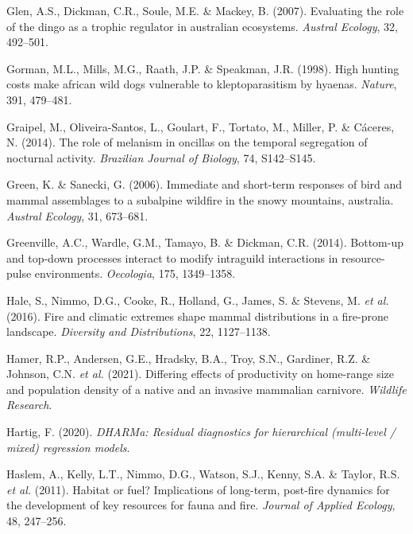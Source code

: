 \documentclass[11pt,a4paper,titlepage,twoside,openright]{style/unimelbthesis}
\begin{document}
\begin{mainmatter}
\leavevmode\hypertarget{ref-glen2007evaluating}{}%
Glen, A.S., Dickman, C.R., Soule, M.E. \& Mackey, B. (2007). Evaluating the role of the dingo as a trophic regulator in australian ecosystems. \emph{Austral Ecology}, 32, 492--501.

\leavevmode\hypertarget{ref-gorman1998high}{}%
Gorman, M.L., Mills, M.G., Raath, J.P. \& Speakman, J.R. (1998). High hunting costs make african wild dogs vulnerable to kleptoparasitism by hyaenas. \emph{Nature}, 391, 479--481.

\leavevmode\hypertarget{ref-graipel2014role}{}%
Graipel, M., Oliveira-Santos, L., Goulart, F., Tortato, M., Miller, P. \& Cáceres, N. (2014). The role of melanism in oncillas on the temporal segregation of nocturnal activity. \emph{Brazilian Journal of Biology}, 74, S142--S145.

\leavevmode\hypertarget{ref-green2006immediate}{}%
Green, K. \& Sanecki, G. (2006). Immediate and short-term responses of bird and mammal assemblages to a subalpine wildfire in the snowy mountains, australia. \emph{Austral Ecology}, 31, 673--681.

\leavevmode\hypertarget{ref-greenville2014bottom}{}%
Greenville, A.C., Wardle, G.M., Tamayo, B. \& Dickman, C.R. (2014). Bottom-up and top-down processes interact to modify intraguild interactions in resource-pulse environments. \emph{Oecologia}, 175, 1349--1358.

\leavevmode\hypertarget{ref-hale2016fire}{}%
Hale, S., Nimmo, D.G., Cooke, R., Holland, G., James, S. \& Stevens, M. \emph{et al.} (2016). Fire and climatic extremes shape mammal distributions in a fire-prone landscape. \emph{Diversity and Distributions}, 22, 1127--1138.

\leavevmode\hypertarget{ref-hamer2021differing}{}%
Hamer, R.P., Andersen, G.E., Hradsky, B.A., Troy, S.N., Gardiner, R.Z. \& Johnson, C.N. \emph{et al.} (2021). Differing effects of productivity on home-range size and population density of a native and an invasive mammalian carnivore. \emph{Wildlife Research}.

\leavevmode\hypertarget{ref-DHARMa}{}%
Hartig, F. (2020). \emph{DHARMa: Residual diagnostics for hierarchical (multi-level / mixed) regression models}.

\leavevmode\hypertarget{ref-haslem2011habitat}{}%
Haslem, A., Kelly, L.T., Nimmo, D.G., Watson, S.J., Kenny, S.A. \& Taylor, R.S. \emph{et al.} (2011). Habitat or fuel? Implications of long-term, post-fire dynamics for the development of key resources for fauna and fire. \emph{Journal of Applied Ecology}, 48, 247--256.


\end{mainmatter}
\end{document}
